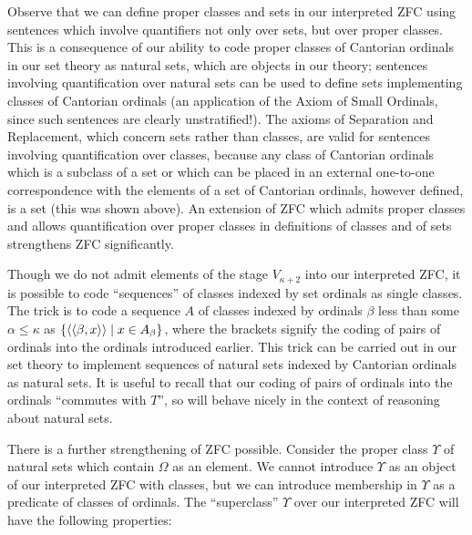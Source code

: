 Observe that we can define proper classes and sets in our interpreted
ZFC using sentences which involve
quantifiers not only over 
sets, but over proper classes.  This is a consequence of our ability
to code proper classes of Cantorian
ordinals in our set theory as 
natural sets, which are objects in our theory; sentences involving
quantification over natural sets can be used to define sets
implementing classes of Cantorian ordinals (an application of the
Axiom of Small Ordinals, since such sentences
are clearly 
unstratified!).  The axioms of
Separation and
Replacement, which 
concern sets rather than classes, are valid for sentences involving
quantification over classes, because any class of Cantorian
ordinals 
which is a subclass of a set or which can be placed in an external
one-to-one correspondence with the elements of a set of Cantorian
ordinals, however defined, is a set (this was shown above).  An
extension of ZFC which admits proper
classes  and allows quantification over proper classes in definitions of classes and of
sets strengthens ZFC significantly.

Though we do not admit elements of the stage $V_{\kappa+2}$ into our
interpreted ZFC, it is possible to code
``sequences'' of 
classes indexed by set ordinals as single classes.  The
trick is to 
code a sequence $A$ of classes indexed by ordinals $\beta$ less than
some $\alpha \leq \kappa$ as $\{\left<\left<\beta,x\right>\right>\mid
x \in A_{\beta}\}$, where the brackets signify the coding of
pairs of 
ordinals into the ordinals introduced earlier.  This trick can be
carried out in our set theory to implement sequences of natural sets
indexed by Cantorian ordinals as natural sets.  It is
useful to recall 
that our coding of pairs of ordinals into the ordinals ``commutes with
$T$'', so will behave nicely in the context of reasoning about natural
sets.

There is a further strengthening of ZFC
possible.  Consider 
the proper class $\Upsilon$ of natural sets which contain $\Omega$ as
an element.  We cannot introduce $\Upsilon$ as an object of our
interpreted ZFC with classes, but we can introduce membership
in $\Upsilon$ as a predicate of classes of ordinals.
The ``superclass'' $\Upsilon$ over our interpreted ZFC will have
the following properties:


